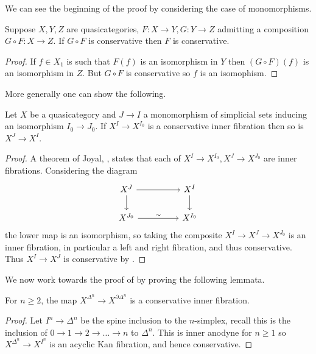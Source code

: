 We can see the beginning of the proof by considering the case of monomorphisms. 
\begin{proposition}\label{prop: composition of conservative functors}
    Suppose $X,Y,Z$ are quasicategories, $F:X\to Y, G:Y\to Z$ admitting a composition $G\circ F:X\to Z$. If $G\circ F$ is conservative then $F$ is conservative. 
\end{proposition}
\begin{proof}
    If $f\in X_{1}$ is such that $F(f)$ is an isomorphism in $Y$ then $(G\circ F)(f)$ is an isomorphism in $Z$. But $G\circ F$ is conservative so $f$ is an isomophism. 
\end{proof}
More generally one can show the following. 
\begin{lemma}
    Let $X$ be a quasicategory and $J\to I$ a monomorphism of simplicial sets inducing an isomorphism $I_{0}\to J_{0}$. If $X^{I}\to X^{I_{0}}$ is a conservative inner fibration then so is $X^{J}\to X^{I}$. 
\end{lemma}
\begin{proof}
    A theorem of Joyal, , states that each of $X^{I}\to X^{I_{0}}, X^{J}\to X^{J_{0}}$ are inner fibrations. Considering the diagram 
    $$%
    \begin{tikzcd}
        {X^{J}} && {X^{I}} \\
        {X^{J_{0}}} && {X^{I_{0}}}
        \arrow["\sim", from=2-1, to=2-3]
        \arrow[from=1-1, to=2-1]
        \arrow[from=1-3, to=2-3]
        \arrow[from=1-1, to=1-3]
    \end{tikzcd}$$
    the lower map is an isomorphism, so taking the composite $X^{I}\to X^{J}\to X^{J_{0}}$ is an inner fibration, in particular a left and right fibration, and thus conservative. Thus $X^{I}\to X^{J}$ is conservative by . 
\end{proof}
We now work towards the proof of  by proving the following lemmata. 
\begin{lemma}\label{lem: conservativity of higher simplices}
    For $n\geq 2$, the map $X^{\Delta^{n}}\to X^{\partial\Delta^{n}}$ is a conservative inner fibration. 
\end{lemma}
\begin{proof}
    Let $I^{n}\to\Delta^{n}$ be the spine inclusion to the $n$-simplex, recall this is the inclusion of $0\to 1\to 2\to\dots\to n$ to $\Delta^{n}$. This is inner anodyne for $n\geq 1$ so $X^{\Delta^{n}}\to X^{I^{n}}$ is an acyclic Kan fibration, and hence conservative. 
\end{proof}
